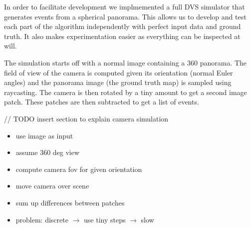 In order to facilitate development we implmemented a full DVS simulator that
generates events from a spherical panorama.  This allows us to develop and test
each part of the algorithm independently with perfect input data and ground
truth. It also makes experimentation easier as everything can be inspected at
will.

The simulation starts off with a normal image containing a 360 \degree panorama. The field of view of the camera is computed given its orientation (normal Euler angles) and the panorama image (the ground truth map) is sampled using raycasting. The camera is then rotated by a tiny amount to get a second image patch. These patches are then subtracted to get a list of events.

// TODO insert section to explain camera simulation

\begin{itemize}
\item use image as input
\item assume 360 deg view
\item compute camera fov for given orientation
\item move camera over scene
\item sum up differences between patches
\item problem: discrete
	$\rightarrow$ use tiny steps
		$\rightarrow$ slow
\end{itemize}


